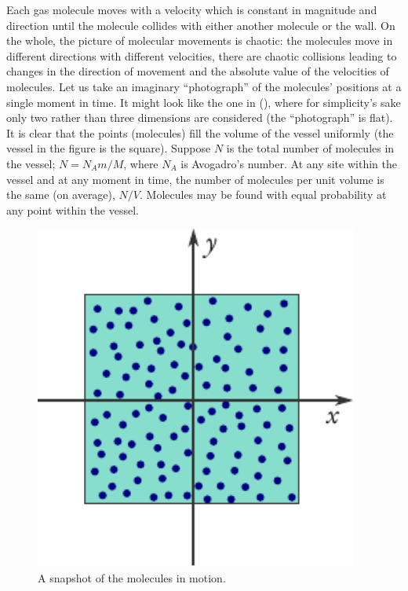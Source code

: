 Each gas molecule moves with a velocity which is constant in magnitude and direction until the molecule collides with either another molecule or the wall. On the whole, the picture of molecular movements is chaotic: the molecules move in different directions with different velocities, there are chaotic collisions leading to changes in the direction of movement and the absolute value of the velocities of molecules. Let us take an imaginary ``photograph'' of the molecules' positions at a single moment in time. It might look like the one in (), where for simplicity's sake only two rather than three dimensions are considered (the ``photograph'' is flat). It is clear that the points (molecules) fill the volume of the vessel uniformly (the vessel in the figure is the square). Suppose $N$ is the total number of molecules in the vessel; $N=N_{A}m /M$, where $N_{A}$ is Avogadro's number. At any site within the vessel and at any moment in time, the number of molecules per unit volume is the same (on average), $N/V$. Molecules may be found with equal probability at any point within the vessel.
\begin{figure}%
\centering
\includegraphics[width=0.95\textwidth]{figures/mol-photo.pdf}
\caption{A snapshot of the molecules in motion.\label{mol-photo}}
\end{figure}

